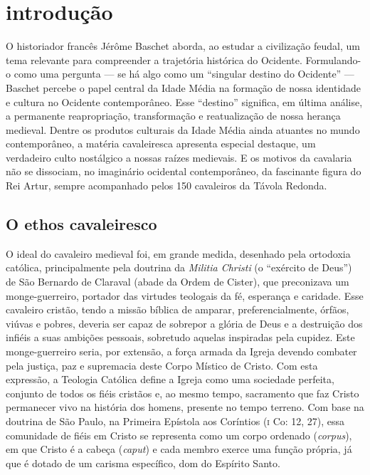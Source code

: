\begingroup

\chapter[Introdução, por Marcus Baccega]{introdução}
\pagestyle{estilo}
\makeatletter
{}
\makeatother

O historiador francês Jérôme Baschet aborda, ao estudar a
civilização feudal, um tema relevante para compreender a trajetória
histórica do Ocidente. Formulando-o como uma pergunta --- se há algo como
um “singular destino do Ocidente” --- Baschet percebe o papel central da
Idade Média na formação de nossa identidade e cultura no Ocidente
contemporâneo. Esse “destino” significa, em última análise, a
permanente reapropriação, transformação e reatualização de nossa
herança medieval. Dentre os produtos culturais da Idade Média ainda
atuantes no mundo contemporâneo, a matéria cavaleiresca apresenta
especial destaque, um verdadeiro culto nostálgico a nossas raízes
medievais. E os motivos da cavalaria não se dissociam, no imaginário
ocidental contemporâneo, da fascinante figura do Rei Artur, sempre
acompanhado pelos 150 cavaleiros da Távola Redonda. 

\section{O ethos cavaleiresco}

O ideal do cavaleiro medieval foi, em grande medida, desenhado pela
ortodoxia católica, principalmente pela doutrina da \textit{Militia
Christi} (o “exército de Deus”) de São Bernardo de Claraval (abade da
Ordem de Cister), que preconizava um monge-guerreiro, portador das
virtudes teologais da fé, esperança e caridade. Esse cavaleiro cristão,
tendo a missão bíblica de amparar, preferencialmente, órfãos, viúvas e
pobres, deveria ser capaz de sobrepor a glória de Deus e a destruição
dos infiéis a suas ambições pessoais, sobretudo aquelas inspiradas pela
cupidez. Este monge-guerreiro seria, por extensão, a força armada da
Igreja devendo combater pela justiça, paz e supremacia deste Corpo
Místico de Cristo. Com esta expressão, a Teologia Católica define a
Igreja como uma sociedade perfeita, conjunto de todos os fiéis cristãos
e, ao mesmo tempo, sacramento que faz Cristo permanecer vivo na
história dos homens, presente no tempo terreno. Com base na doutrina de
São Paulo, na Primeira Epístola aos Coríntios (\textsc{i} Co: 12, 27), essa
comunidade de fiéis em Cristo se representa como um corpo ordenado
(\textit{corpus}), em que Cristo é a cabeça (\textit{caput}) e cada
membro exerce uma função própria, já que é dotado de um carisma
específico, dom do Espírito Santo. 

